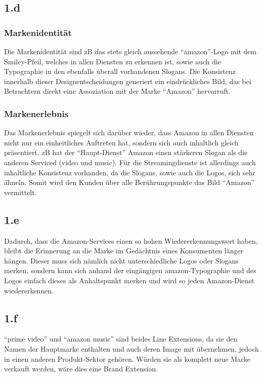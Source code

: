 \documentclass{article}
\begin{document}
\subsection{1.d}
\subsubsection{Markenidentität}
Die Markenidentität sind zB das stets gleich aussehende "`amazon"'-Logo mit dem Smiley-Pfeil, welches in allen Diensten zu erkennen ist, sowie auch die Typographie in den ebenfalls überall vorhandenen Slogans. Die Konsistenz innerhalb dieser Designentscheidungen generiert ein eindrückliches Bild, das bei Betrachtern direkt eine Assoziation mit der Marke "`Amazon"' hervorruft.

\subsubsection{Markenerlebnis}
Das Markenerlebnis spiegelt sich darüber wieder, dass Amazon in allen Diensten nicht nur ein einheitliches Auftreten hat, sondern sich auch inhaltlich gleich präsentiert. zB hat der "`Haupt-Dienst"' Amazon einen stärkeren Slogan als die anderen Serviced (video und music). Für die Streamingdienste ist allerdings auch inhaltliche Konsistenz vorhanden, da die Slogans, sowie auch die Logos, sich sehr ähneln. Somit wird den Kunden über alle Berührungspunkte das Bild "`Amazon"' vermittelt.

\subsection{1.e}
Dadurch, dass die Amazon-Services einen so hohen Wiedererkennungswert haben, bleibt die Erinnerung an die Marke im Gedächtnis eines Konsumenten länger hängen. Dieser muss sich nämlich nicht unterschiedliche Logos oder Slogans merken, sondern kann sich anhand der eingängigen amazon-Typographie und des Logos einfach dieses als Anhaltspunkt merken und wird so jeden Amazon-Dienst wiedererkennen.

\subsection{1.f}
"`prime video"' und "`amazon music"' sind beides Line Extensions, da sie den Namen der Hauptmarke enthalten und auch deren Image mit übernehmen, jedoch in einen anderen Produkt-Sektor gehören. Würden sie als komplett neue Marke verkauft werden, wäre dies eine Brand Extension.
\end{document}
